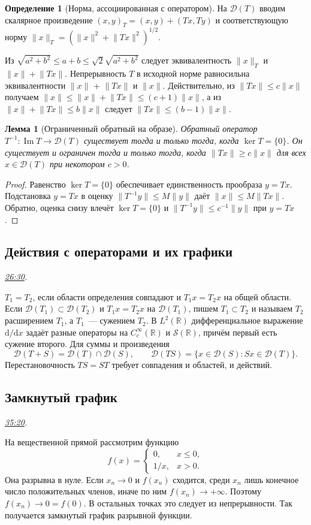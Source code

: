 \documentclass[11pt,a4paper]{article}
\theoremstyle{plain}
\newtheorem{lemma}[theorem]{Лемма}
\theoremstyle{definition}
\newtheorem{definition}[theorem]{Определение}
\newcommand{\RR}{\mathbb R}
\newcommand{\Dom}{\mathcal D}
\newcommand{\norm}[1]{\lVert#1\rVert}
\newcommand{\sch}[1]{C_c^\infty(#1)}
\newcommand{\at}[3]{\href{https://www.youtube.com/watch?v=#1&t=#2s}{#3}}
\newcommand{\topic}[2]{\Needspace{5\baselineskip}\subsection*{#1}\noindent\emph{#2.}\par\nobreak\smallskip}
\begin{document}
\begin{definition}[Норма, ассоциированная с оператором]
На $\Dom(T)$ вводим скалярное произведение
$(x,y)_T=(x,y)+(Tx,Ty)$ и соответствующую норму
$\norm x_T=(\norm x^2+\norm{Tx}^2)^{1/2}$.
\end{definition}
Из
$\sqrt{a^2+b^2}\le a+b\le\sqrt 2\sqrt{a^2+b^2}$
следует эквивалентность $\norm x_T$ и $\norm x+\norm{Tx}$.
Непрерывность $T$ в исходной норме равносильна эквивалентности
$\norm x$ + $\norm{Tx}$ и $\norm x$. Действительно, из $\norm{Tx}\le c\norm x$
получаем $\norm x\le\norm x + \norm{Tx}\le(c+1)\norm x$, а из
$\norm x + \norm {Tx}\le b\norm x$ следует $\norm{Tx}\le (b-1)\norm x$.

\begin{lemma}[Ограниченный обратный на образе]
Обратный оператор $T^{-1}\colon\operatorname{Im}T\to\Dom(T)$
существует тогда и только тогда, когда $\ker T=\{0\}$.
Он существует и ограничен тогда и только тогда, когда
$\norm{Tx}\ge c\norm x$ для всех $x\in\Dom(T)$ при некотором $c>0$.
\end{lemma}
\begin{proof}
Равенство $\ker T=\{0\}$ обеспечивает единственность прообраза
$y=Tx$. Подстановка $y=Tx$ в оценку $\norm{T^{-1}y}\le M\norm y$
даёт $\norm x\le M\norm{Tx}$. Обратно, оценка снизу влечёт
$\ker T=\{0\}$ и $\norm{T^{-1}y}\le c^{-1}\norm y$ при $y=Tx$.
\end{proof}

\topic{Действия с операторами и их графики}{\at{HFKXR_j7aA4}{1590}{26:30}}
$T_1=T_2$, если области определения совпадают и $T_1x=T_2x$
на общей области. Если $\Dom(T_1)\subset\Dom(T_2)$ и $T_1x=T_2x$
на $\Dom(T_1)$, пишем $T_1\subset T_2$ и называем $T_2$ расширением
$T_1$, а $T_1$~--- сужением $T_2$. В $L^2(\RR)$ дифференциальное
выражение $\mathrm d/\mathrm dx$ задаёт разные операторы на
$\sch{\RR}$ и $\mathcal S(\RR)$, причём первый есть сужение второго.
Для суммы и произведения
\[
 \Dom(T+S)=\Dom(T)\cap\Dom(S),\qquad
 \Dom(TS)=\{x\in\Dom(S): Sx\in\Dom(T)\}.
\]
Перестановочность $TS=ST$ требует совпадения и областей, и действий.

\topic{Замкнутый график}{\at{HFKXR_j7aA4}{2120}{35:20}}
На вещественной прямой рассмотрим функцию
\[
 f(x)=\begin{cases}0,&x\le0,\\ 1/x,&x>0.\end{cases}
\]
Она разрывна в нуле. Если $x_n\to0$ и $f(x_n)$ сходится,
среди $x_n$ лишь конечное число положительных членов, иначе
по ним $f(x_n)\to+\infty$. Поэтому $f(x_n)\to0=f(0)$.
В остальных точках это следует из непрерывности. Так получается
замкнутый график разрывной функции.
\end{document}
